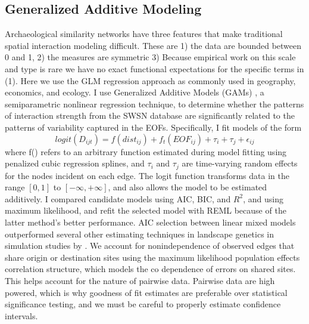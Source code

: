 \documentclass[10pt]{iopart}
\begin{document}
\subsection*{Generalized Additive Modeling}
Archaeological similarity networks have three features that make traditional spatial interaction modeling difficult. These are 1) the data are bounded between 0 and 1, 2) the measures are symmetric
3) Because empirical work on this scale and type is rare we have no exact functional expectations for the specific terms in (1).
Here we use the GLM regression approach as commonly used in geography, economics, and ecology. I use Generalized Additive Models (GAMs) \parencite{Wood2006a}, a semiparametric nonlinear regression technique, to determine whether the patterns of interaction strength from the SWSN database are significantly related to the patterns of variability captured in the EOFs. Specifically, I fit models of the form
\begin{equation}
    logit\left(D_{ijt}\right) = f(dist_{ij}) + f_t(EOF_{ij}) + \tau_i + \tau_j + \epsilon_{ij}
\end{equation}
where f() refers to an arbitrary function estimated during model fitting using penalized cubic regression splines, and $\tau_i$ and $\tau_j$ are time-varying random effects for the nodes incident on each edge. The logit function transforms data in the range $[0, 1]$ to $[-\infty, +\infty]$, and also allows the model to be estimated additively. I compared candidate models using AIC, BIC, and $R^2$, and using maximum likelihood, and refit the selected model with REML because of the latter method's better performance. AIC selection between linear mixed models outperformed several other estimating techniques in landscape genetics in simulation studies by \parencite{Shirk et al 2018}. We account for nonindependence of observed edges that share origin or destination sites using the maximum likelihood population effects correlation structure, which models the co dependence of errors on shared sites. This helps account for the nature of pairwise data. Pairwise data are high powered, which is why goodness of fit estimates are preferable over statistical significance testing, and we must be careful to properly estimate confidence intervals.

\end{document}
